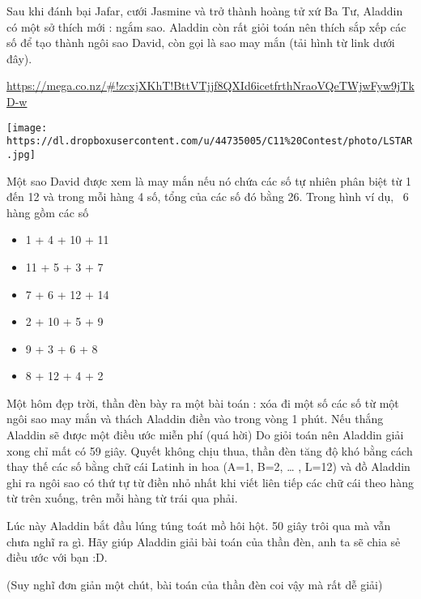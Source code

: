 Sau khi đánh bại Jafar, cưới Jasmine và trở thành hoàng tử xứ Ba Tư, Aladdin có một sở thích mới : ngắm sao. Aladdin còn rất giỏi toán nên thích sắp xếp các số để tạo thành ngôi sao David, còn gọi là sao may mắn (tải hình từ link dưới đây).  

\href{https://mega.co.nz/#!zcxjXKhT!BttVTjjf8QXId6icetfrthNraoVQeTWjwFyw9jTkD-w}{    https://mega.co.nz/\#!zcxjXKhT!BttVTjjf8QXId6icetfrthNraoVQeTWjwFyw9jTkD-w   }


\texttt{[image: https://dl.dropboxusercontent.com/u/44735005/C11\%20Contest/photo/LSTAR.jpg]}

   Một sao David được xem là may mắn nếu nó chứa các số tự nhiên phân biệt từ 1 đến 12 và trong mỗi hàng 4 số, tổng của các số đó bằng 26. Trong hình ví dụ,  6 hàng gồm các số  
\begin{itemize}
	\item     1 + 4 + 10 + 11   
	\item     11 + 5 + 3 + 7   
	\item     7 + 6 + 12 + 14   
	\item     2 + 10 + 5 + 9   
	\item     9 + 3 + 6 + 8   
	\item     8 + 12 + 4 + 2   
\end{itemize}

   Một hôm đẹp trời, thần đèn bày ra một bài toán : xóa đi một số các số từ một ngôi sao may mắn và thách Aladdin điền vào trong vòng 1 phút. Nếu thắng Aladdin sẽ được một điều ước miễn phí (quá hời) Do giỏi toán nên Aladdin giải xong chỉ mất có 59 giây. Quyết không chịu thua, thần đèn tăng độ khó bằng cách thay thế các số bằng chữ cái Latinh in hoa (A=1, B=2, … , L=12) và đồ Aladdin ghi ra ngôi sao có thứ tự từ điền nhỏ nhất khi viết liên tiếp các chữ cái theo hàng từ trên xuống, trên mỗi hàng từ trái qua phải.  

   Lúc này Aladdin bắt đầu lúng túng toát mồ hôi hột. 50 giây trôi qua mà vẫn chưa nghĩ ra gì. Hãy giúp Aladdin giải bài toán của thần đèn, anh ta sẽ chia sẻ điều ước với bạn :D.   


   (Suy nghĩ đơn giản một chút, bài toán của thần đèn coi vậy mà rất dễ giải)
